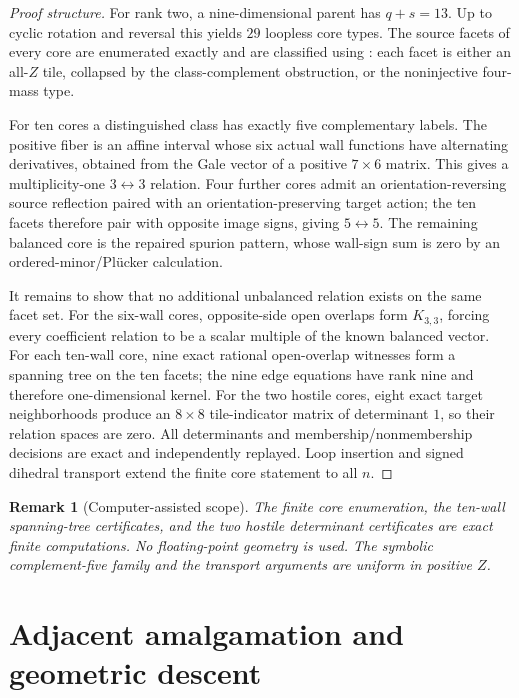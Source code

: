 \documentclass[11pt]{article}
\newtheorem{remark}[theorem]{Remark}
\newcommand{\1}{\mathbf 1}
\begin{document}
\begin{proof}[Proof structure]
For rank two, a nine-dimensional parent has $q+s=13$.  Up to cyclic
rotation and reversal this yields $29$ loopless core types.  The source
facets of every core are enumerated exactly and are classified using
: each facet is either an all-$Z$ tile, collapsed by
the class-complement obstruction, or the noninjective four-mass type.

For ten cores a distinguished class has exactly five complementary labels.
The positive fiber is an affine interval whose six actual wall functions
have alternating derivatives, obtained from the Gale vector of a positive
$7\times6$ matrix.  This gives a multiplicity-one $3\leftrightarrow3$
relation.  Four further cores admit an orientation-reversing source
reflection paired with an orientation-preserving target action; the ten
facets therefore pair with opposite image signs, giving
$5\leftrightarrow5$.  The remaining balanced core is the repaired spurion
pattern, whose wall-sign sum is zero by an ordered-minor/Pl\"ucker
calculation.

It remains to show that no additional unbalanced relation exists on the
same facet set.  For the six-wall cores, opposite-side open overlaps form
$K_{3,3}$, forcing every coefficient relation to be a scalar multiple of
the known balanced vector.  For each ten-wall core, nine exact rational
open-overlap witnesses form a spanning tree on the ten facets; the nine
edge equations have rank nine and therefore one-dimensional kernel.
For the two hostile cores, eight exact target neighborhoods produce an
$8\times8$ tile-indicator matrix of determinant $1$, so their relation
spaces are zero.  All determinants and membership/nonmembership decisions
are exact and independently replayed.  Loop insertion and signed dihedral
transport extend the finite core statement to all $n$.
\end{proof}

\begin{remark}[Computer-assisted scope]
The finite core enumeration, the ten-wall spanning-tree certificates, and
the two hostile determinant certificates are exact finite computations.
No floating-point geometry is used.  The symbolic complement-five family
and the transport arguments are uniform in positive $Z$.
\end{remark}

\section{Adjacent amalgamation and geometric descent}
\label{sec:amalgamation}
\end{document}
